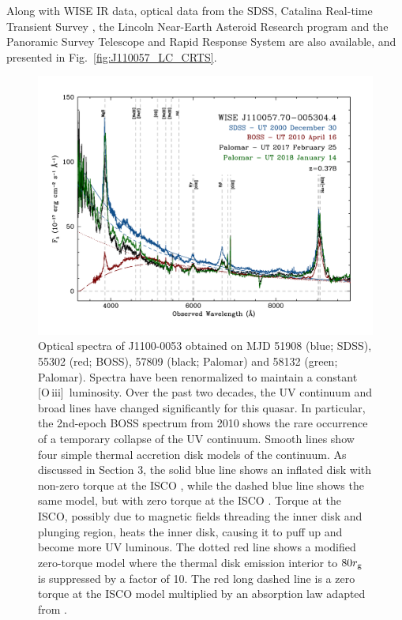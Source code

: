 \documentclass[a4paper,fleqn,usenatbib]{mnras}
\begin{document}
Along with WISE IR data, optical data from the SDSS, Catalina
Real-time Transient Survey \citep[CRTS;][]{Drake2009, Mahabal2011},
the Lincoln Near-Earth Asteroid Research \citep[LINEAR; ][]{Sesar2011}
program and the Panoramic Survey Telescope and Rapid Response System
\citep[PanSTARRS;][]{Kaiser2010, Stubbs2010, Tonry2012, Magnier2013}
are also available, and presented in Fig.~\ref{fig:J110057_LC_CRTS}.




\begin{figure}
  \centering
  \includegraphics[width=17.00cm, trim=0.0cm 0.0cm 0.0cm 0.0cm, clip]
  {../plots/spectra/w1100m0052_sdss2.pdf}
\vspace{-16pt}
  \caption[]{
    Optical spectra of J1100-0053 obtained on MJD 51908 (blue; SDSS),
    55302 (red; BOSS), 57809 (black; Palomar) and 58132 (green;
    Palomar). Spectra have been renormalized to maintain a constant
    [O\,{\sc iii}]\ luminosity. Over the past two decades, the UV
    continuum and broad lines have changed significantly for this quasar.
    In particular, the 2nd-epoch BOSS spectrum from 2010 shows the rare
    occurrence of a temporary collapse of the UV continuum.  Smooth lines
    show four simple thermal accretion disk models of the continuum.
    As discussed in Section 3, the 
    solid blue line shows an inflated disk with non-zero torque at the
    ISCO \cite[e.g.,][]{Sirko_Goodman2003}, while the dashed blue line
    shows the same model, but with zero torque at the ISCO \cite[i.e.,
    equivalent to a simple $\alpha$-disk model,][]{SS73}.  Torque at the
    ISCO, possibly due to magnetic fields threading the inner disk and
    plunging region, heats the inner disk, causing it to puff up and
    become more UV luminous.  The dotted red line shows a modified
    zero-torque model where the thermal disk emission interior to $80
    r_{\rm g}$ is suppressed by a factor of 10.
    The red long dashed line is a zero
    torque at the ISCO model multiplied by an absorption law adapted from
    \citet{Guo2016}.
}
  \label{fig:J110057_spectra}
\end{figure}
\end{document}
